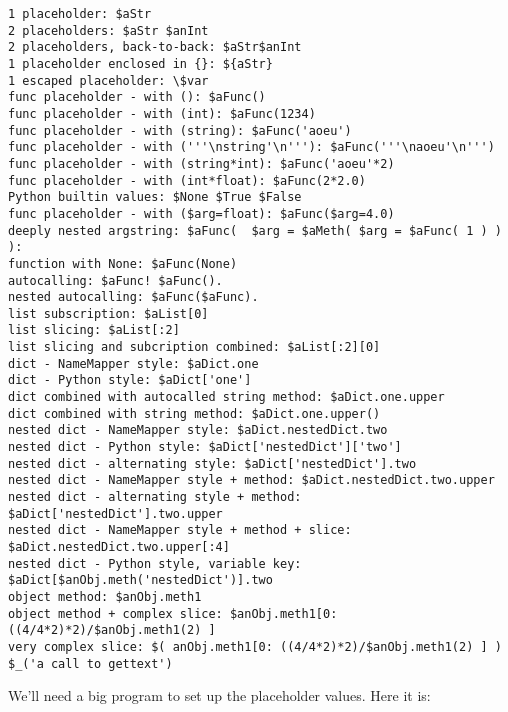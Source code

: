 \begin{verbatim}
1 placeholder: $aStr
2 placeholders: $aStr $anInt
2 placeholders, back-to-back: $aStr$anInt
1 placeholder enclosed in {}: ${aStr}
1 escaped placeholder: \$var
func placeholder - with (): $aFunc()
func placeholder - with (int): $aFunc(1234)
func placeholder - with (string): $aFunc('aoeu')
func placeholder - with ('''\nstring'\n'''): $aFunc('''\naoeu'\n''')
func placeholder - with (string*int): $aFunc('aoeu'*2)
func placeholder - with (int*float): $aFunc(2*2.0)
Python builtin values: $None $True $False
func placeholder - with ($arg=float): $aFunc($arg=4.0)
deeply nested argstring: $aFunc(  $arg = $aMeth( $arg = $aFunc( 1 ) ) ):
function with None: $aFunc(None)
autocalling: $aFunc! $aFunc().
nested autocalling: $aFunc($aFunc).
list subscription: $aList[0]
list slicing: $aList[:2]
list slicing and subcription combined: $aList[:2][0]
dict - NameMapper style: $aDict.one
dict - Python style: $aDict['one']
dict combined with autocalled string method: $aDict.one.upper
dict combined with string method: $aDict.one.upper()
nested dict - NameMapper style: $aDict.nestedDict.two
nested dict - Python style: $aDict['nestedDict']['two']
nested dict - alternating style: $aDict['nestedDict'].two
nested dict - NameMapper style + method: $aDict.nestedDict.two.upper
nested dict - alternating style + method: $aDict['nestedDict'].two.upper
nested dict - NameMapper style + method + slice: $aDict.nestedDict.two.upper[:4]
nested dict - Python style, variable key: $aDict[$anObj.meth('nestedDict')].two
object method: $anObj.meth1
object method + complex slice: $anObj.meth1[0: ((4/4*2)*2)/$anObj.meth1(2) ]
very complex slice: $( anObj.meth1[0: ((4/4*2)*2)/$anObj.meth1(2) ] )
$_('a call to gettext')
\end{verbatim}

We'll need a big program to set up the placeholder values.  Here it is:

